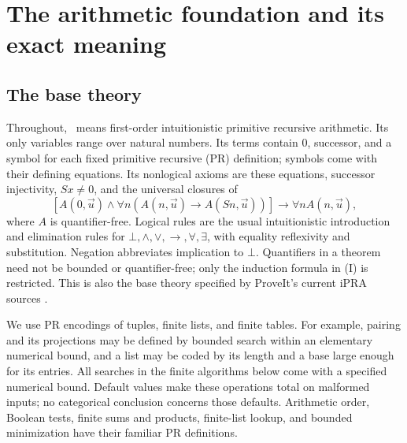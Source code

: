 \section{The arithmetic foundation and its exact meaning}\label{sec:foundation}

\subsection{The base theory}
Throughout, \ipra\ means first-order intuitionistic primitive recursive arithmetic.
Its only variables range over natural numbers. Its terms contain $0$, successor,
and a symbol for each fixed primitive recursive (PR) definition; symbols come
with their defining equations. Its nonlogical axioms are these equations,
successor injectivity, $Sx\ne0$, and the universal closures of
\[
 [A(0,\vec u)\wedge\forall n(A(n,\vec u)\to A(Sn,\vec u))]
       \longrightarrow\forall n A(n,\vec u),                 \tag{I}
\]
where $A$ is quantifier-free. Logical rules are the usual intuitionistic
introduction and elimination rules for $\bot,\wedge,\vee,\to,\forall,\exists$,
with equality reflexivity and substitution. Negation abbreviates implication
to $\bot$. Quantifiers in a theorem need not be bounded or quantifier-free;
only the induction formula in (I) is restricted. This is also the base theory
specified by ProveIt's current iPRA sources \cite{repo-readme,repo-pr}.

We use PR encodings of tuples, finite lists, and finite tables. For example,
pairing and its projections may be defined by bounded search within an
elementary numerical bound, and a list may be coded by its length and a
base large enough for its entries. All searches in the finite algorithms below
come with a specified numerical bound. Default values make these operations
total on malformed inputs; no categorical conclusion concerns those defaults.
Arithmetic order, Boolean tests, finite sums and products, finite-list lookup,
and bounded minimization have their familiar PR definitions.

